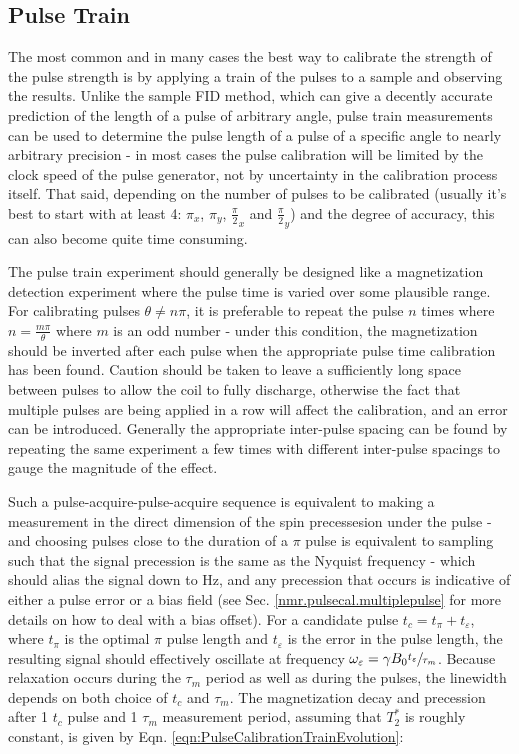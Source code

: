 \documentclass[PaulGanssle-Thesis.tex]{subfiles}
\begin{document}
\subsection{Pulse Train}
\label{nmr.pulsecal.pulsetrain}
The most common and in many cases the best way to calibrate the strength of the pulse strength is by applying a train of the pulses to a sample and observing the results. Unlike the sample FID method, which can give a decently accurate prediction of the length of a pulse of arbitrary angle, pulse train measurements can be used to determine the pulse length of a pulse of a specific angle to nearly arbitrary precision - in most cases the pulse calibration will be limited by the clock speed of the pulse generator, not by uncertainty in the calibration process itself. That said, depending on the number of pulses to be calibrated (usually it's best to start with at least 4: $\pi_{x}$, $\pi_{y}$, $\tfrac{\pi}{2}_{x}$ and $\tfrac{\pi}{2}_{y}$) and the degree of accuracy, this can also become quite time consuming.

The pulse train experiment should generally be designed like a magnetization detection experiment where the pulse time is varied over some plausible range. For calibrating pulses $\theta \neq n\pi$, it is preferable to repeat the pulse $n$ times where $n = \tfrac{m\pi}{\theta}$ where $m$ is an odd number - under this condition, the magnetization should be inverted after each pulse when the appropriate pulse time calibration has been found. Caution should be taken to leave a sufficiently long space between pulses to allow the coil to fully discharge, otherwise the fact that multiple pulses are being applied in a row will affect the calibration, and an error can be introduced. Generally the appropriate inter-pulse spacing can be found by repeating the same experiment a few times with different inter-pulse spacings to gauge the magnitude of the effect.

Such a pulse-acquire-pulse-acquire sequence is equivalent to making a measurement in the direct dimension of the spin precessesion under the pulse - and choosing pulses close to the duration of a $\pi$ pulse is equivalent to sampling such that the signal precession is the same as the Nyquist frequency - which should alias the signal down to \unit[0]{Hz}, and any precession that occurs is indicative of either a pulse error or a bias field (see Sec. \ref{nmr.pulsecal.multiplepulse} for more details on how to deal with a bias offset). For a candidate pulse $t_{c} = t_{\pi} + t_{\varepsilon}$, where $t_{\pi}$ is the optimal $\pi$ pulse length and $t_{\varepsilon}$ is the error in the pulse length, the resulting signal should effectively oscillate at frequency $\omega_{\varepsilon} = \gamma B_{0} \sfrac{t_{\varepsilon}}{\tau_{m}}$. Because relaxation occurs during the $\tau_{m}$ period as well as during the pulses, the linewidth depends on both choice of $t_{c}$ and $\tau_{m}$. The magnetization decay and precession after 1 $t_{c}$ pulse and 1 $\tau_{m}$ measurement period, assuming that $T_{2}^*$ is roughly constant, is given by Eqn. \ref{eqn:PulseCalibrationTrainEvolution}:
\end{document}
